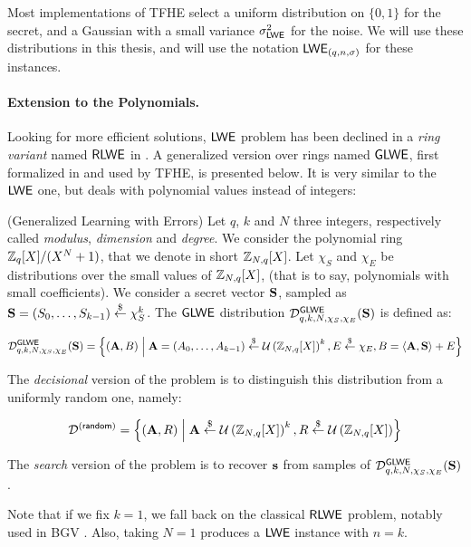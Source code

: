 Most implementations of TFHE select a uniform distribution on $\{0, 1\}$ for the secret, and a Gaussian with a small variance $\sigma_{\textsf{LWE}}^2$ for the noise. We will use these distributions in this thesis, and will use the notation $\textsf{LWE}_{(q, n, \sigma)}$ for these instances.



\paragraph{Extension to the Polynomials.}


Looking for more efficient solutions, $\textsf{LWE}$ problem has been declined in a \textit{ring variant} named $\textsf{RLWE}$ in \cite{rlwe}. A generalized version over rings named $\textsf{GLWE}$, first formalized in \cite{EPRINT:BraGenVai11} and used by TFHE, is presented below. It is very similar to the $\textsf{LWE}$ one, but deals with polynomial values instead of integers:

\begin{definition}
	(Generalized Learning with Errors) Let $q$, $k$ and $N$ three integers, respectively called \textit{modulus}, \textit{dimension} and \textit{degree}. We consider the polynomial ring $\mathbb{Z}_q[X] / (X^N + 1)$, that we denote in short $\mathbb{Z}_{N,q}[X]$. Let $\chi_S$ and $\chi_E$ be distributions over the small values of $\mathbb{Z}_{N,q}[X]$, (that is to say, polynomials with small coefficients). We consider a secret vector $\mathbf S$, sampled as $\mathbf S = (S_0, \dots, S_{k-1}) \overset{\$}{\leftarrow} \chi_S^k$. The $\textsf{GLWE}$ distribution $\mathcal{D}_{q, k, N, \chi_S, \chi_E}^{\textsf{GLWE}}(\mathbf S)$ is defined as:
	
	\[
	\mathcal{D}_{q, k, N, \chi_S, \chi_E}^{\textsf{GLWE}}(\mathbf S) = \left \{ (\mathbf A, B) \;\middle|\; \mathbf A = (A_0, \dots, A_{k-1}) \overset{\$}{\leftarrow} \mathcal U \left ( \mathbb{Z}_{N,q}[X] \right )^k, E \overset{\$}{\leftarrow} \chi_E, B = \left \langle \mathbf A, \mathbf S \right \rangle + E \right \}
	\]
	
	The \textit{decisional} version of the problem is to distinguish this distribution from a uniformly random one, namely:
	
	\[
	\mathcal{D}^{(\textsf{random})} = \left \{(\mathbf A, R) \;\middle|\; \mathbf A \overset{\$}{\leftarrow} \mathcal U \left ( \mathbb{Z}_{N,q}[X] \right )^k, R \overset{\$}{\leftarrow} \mathcal U \left ( \mathbb{Z}_{N,q}[X] \right ) \right\}
	\]
	
	The \emph{search} version of the problem is to recover $\mathbf s$ from samples of $\mathcal{D}_{q, k , N, \chi_S, \chi_E}^{\textsf{GLWE}}(\mathbf S)$. 
	\label{def:GLWE}
\end{definition}

Note that if we fix $k = 1$, we fall back on the classical $\textsf{RLWE}$ problem, notably used in BGV \cite{bgv}. Also, taking $N=1$ produces a $\textsf{LWE}$ instance with $n = k$. 

